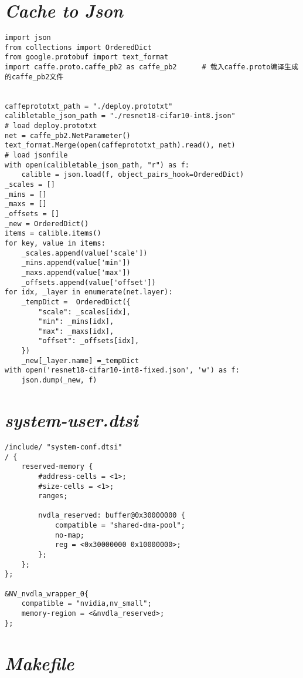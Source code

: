 \section{\emph{Cache to Json}}

\lstset{language=Python}
\begin{lstlisting}
import json
from collections import OrderedDict
from google.protobuf import text_format
import caffe.proto.caffe_pb2 as caffe_pb2      # 载入caffe.proto编译生成的caffe_pb2文件


caffeprototxt_path = "./deploy.prototxt"
calibletable_json_path = "./resnet18-cifar10-int8.json"
# load deploy.prototxt
net = caffe_pb2.NetParameter()
text_format.Merge(open(caffeprototxt_path).read(), net)
# load jsonfile
with open(calibletable_json_path, "r") as f:
    calible = json.load(f, object_pairs_hook=OrderedDict)
_scales = []
_mins = []
_maxs = []
_offsets = []
_new = OrderedDict()
items = calible.items()
for key, value in items:
    _scales.append(value['scale'])
    _mins.append(value['min'])
    _maxs.append(value['max'])
    _offsets.append(value['offset'])
for idx, _layer in enumerate(net.layer):
    _tempDict =  OrderedDict({
        "scale": _scales[idx],
        "min": _mins[idx],
        "max": _maxs[idx],
        "offset": _offsets[idx],
    }) 
    _new[_layer.name] =_tempDict
with open('resnet18-cifar10-int8-fixed.json', 'w') as f:
    json.dump(_new, f)
\end{lstlisting}

\section{\emph{system-user.dtsi}}

\begin{lstlisting}
/include/ "system-conf.dtsi"
/ {
    reserved-memory {
        #address-cells = <1>;
        #size-cells = <1>;
        ranges;
    
        nvdla_reserved: buffer@0x30000000 {
            compatible = "shared-dma-pool";
            no-map;
            reg = <0x30000000 0x10000000>;
        };
    };
};

&NV_nvdla_wrapper_0{
    compatible = "nvidia,nv_small";
    memory-region = <&nvdla_reserved>;
};
\end{lstlisting}

\section{\emph{Makefile}}

